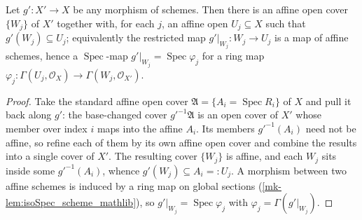 \begin{lemma}\label{mk-lem:openimm_refining_affine_cover}
  \leanok

  Let \(g' : X' \to X\) be any morphism of schemes. Then there is an affine open cover
  \(\{W_j\}\) of \(X'\) together with, for each \(j\), an affine open \(U_j \subseteq X\) such that
  \(g'(W_j) \subseteq U_j\); equivalently the restricted map \(g'|_{W_j} : W_j \to U_j\) is a map
  of affine schemes, hence a \(\operatorname{Spec}\)-map \(g'|_{W_j} = \operatorname{Spec}\varphi_j\)
  for a ring map \(\varphi_j : \Gamma(U_j, \mathcal{O}_X) \to \Gamma(W_j, \mathcal{O}_{X'})\).
\end{lemma}
\begin{proof}
  Take the standard affine open cover \(\mathfrak{A} = \{A_i = \operatorname{Spec} R_i\}\) of \(X\)
  and pull it back along \(g'\): the base-changed cover \(g'^{-1}\mathfrak{A}\) is an open cover of
  \(X'\) whose member over index \(i\) maps into the affine \(A_i\). Its members \(g'^{-1}(A_i)\)
  need not be affine, so refine each of them by its own affine open cover and combine the results
  into a single cover of \(X'\). The resulting cover \(\{W_j\}\) is affine, and each \(W_j\) sits
  inside some \(g'^{-1}(A_i)\), whence \(g'(W_j) \subseteq A_i =: U_j\). A morphism between two
  affine schemes is induced by a ring map on global sections (\ref{mk-lem:isoSpec_scheme_mathlib}),
  so \(g'|_{W_j} = \operatorname{Spec}\varphi_j\) with \(\varphi_j = \Gamma(g'|_{W_j})\).
\end{proof}

